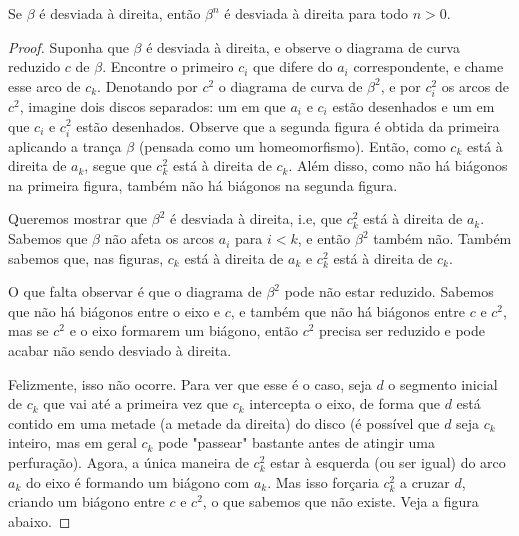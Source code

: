	\begin{lemma}
		\label{desviada a direita, sempre a direita}
		Se $\beta$ é desviada à direita, então $\beta^n$ é desviada à direita para todo $n>0$.
	\end{lemma}
	\begin{proof}
		Suponha que $\beta$ é desviada à direita, e observe o diagrama de curva reduzido $c$ de $\beta$. Encontre o primeiro $c_i$ que difere do $a_i$ correspondente, e chame esse arco de $c_k$. Denotando por $c^2$ o diagrama de curva de $\beta^2$, e por $c_i^2$ os arcos de $c^2$, imagine dois discos separados: um em que $a_i$ e $c_i$ estão desenhados e um em que $c_i$ e $c_i^2$ estão desenhados. Observe que a segunda figura é obtida da primeira aplicando a trança $\beta$ (pensada como um homeomorfismo). Então, como $c_k$ está à direita de $a_k$, segue que $c_k^2$ está à direita de $c_k$. Além disso, como não há biágonos na primeira figura, também não há biágonos na segunda figura.
		\par\vspace{0.3cm} Queremos mostrar que $\beta^2$ é desviada à direita, i.e, que $c_k^2$ está à direita de $a_k$. Sabemos que $\beta$ não afeta os arcos $a_i$ para $i<k$, e então $\beta^2$ também não. Também sabemos que, nas figuras, $c_k$ está à direita de $a_k$ e $c_k^2$ está à direita de $c_k$.
		\par\vspace{0.3cm} O que falta observar é que o diagrama de $\beta^2$ pode não estar reduzido. Sabemos que não há biágonos entre o eixo e $c$, e também que não há biágonos entre $c$ e $c^2$, mas se $c^2$ e o eixo formarem um biágono, então $c^2$ precisa ser reduzido e pode acabar não sendo desviado à direita.
		\par\vspace{0.3cm} Felizmente, isso não ocorre. Para ver que esse é o caso, seja $d$ o segmento inicial de $c_k$ que vai até a primeira vez que $c_k$ intercepta o eixo, de forma que $d$ está contido em uma metade (a metade da direita) do disco (é possível que $d$ seja $c_k$ inteiro, mas em geral $c_k$ pode "passear" bastante antes de atingir uma perfuração). Agora, a única maneira de $c_k^2$ estar à esquerda (ou ser igual) do arco $a_k$ do eixo é formando um biágono com $a_k$. Mas isso forçaria $c_k^2$ a cruzar $d$, criando um biágono entre $c$ e $c^2$, o que sabemos que não existe. Veja a figura abaixo.
		

\end{proof}
